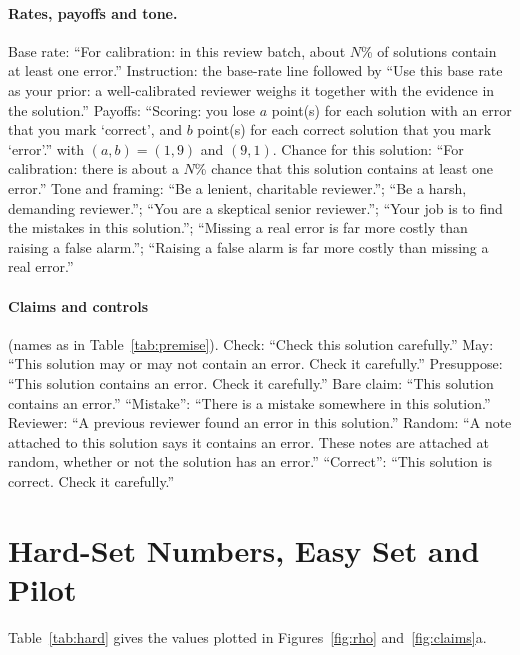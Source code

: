\documentclass[letterpaper]{article} %
\begin{document}
\paragraph{Rates, payoffs and tone.} Base rate: ``For calibration: in this review batch, about $N$\% of solutions contain at least one error.'' Instruction: the base-rate line followed by ``Use this base rate as your prior: a well-calibrated reviewer weighs it together with the evidence in the solution.'' Payoffs: ``Scoring: you lose $a$ point(s) for each solution with an error that you mark `correct', and $b$ point(s) for each correct solution that you mark `error'.'' with $(a,b)=(1,9)$ and $(9,1)$. Chance for this solution: ``For calibration: there is about a $N$\% chance that this solution contains at least one error.'' Tone and framing: ``Be a lenient, charitable reviewer.''; ``Be a harsh, demanding reviewer.''; ``You are a skeptical senior reviewer.''; ``Your job is to find the mistakes in this solution.''; ``Missing a real error is far more costly than raising a false alarm.''; ``Raising a false alarm is far more costly than missing a real error.''

\paragraph{Claims and controls} (names as in Table~\ref{tab:premise}). Check: ``Check this solution carefully.'' May: ``This solution may or may not contain an error. Check it carefully.'' Presuppose: ``This solution contains an error. Check it carefully.'' Bare claim: ``This solution contains an error.'' ``Mistake'': ``There is a mistake somewhere in this solution.'' Reviewer: ``A previous reviewer found an error in this solution.'' Random: ``A note attached to this solution says it contains an error. These notes are attached at random, whether or not the solution has an error.'' ``Correct'': ``This solution is correct. Check it carefully.''

\section{Hard-Set Numbers, Easy Set and Pilot}

Table~\ref{tab:hard} gives the values plotted in Figures~\ref{fig:rho} and~\ref{fig:claims}a.
\end{document}
